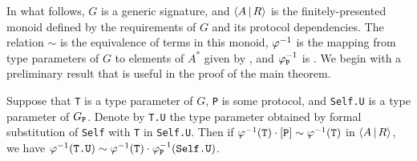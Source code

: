 \documentclass[../generics]{subfiles}
\begin{document}
In what follows, $G$ is a generic signature, and $\langle A\,|\,R\rangle$ is the finitely-presented monoid defined by the requirements of $G$ and its protocol dependencies. The relation $\sim$ is the equivalence of terms in this monoid, $\varphi^{-1}$ is the mapping from type parameters of $G$ to elements of $A^*$ given by , and $\varphi^{-1}_\texttt{P}$ is . We begin with a preliminary result that is useful in the proof of the main theorem.

\begin{lemma}\label{type param composition lemma}
Suppose that \texttt{T} is a type parameter of $G$, \texttt{P} is some protocol, and \texttt{Self.U} is a type parameter of $G_{\texttt{P}}$. Denote by \texttt{T.U} the type parameter obtained by formal substitution of \texttt{Self} with \texttt{T} in \texttt{Self.U}. Then if $\varphi^{-1}(\texttt{T})\cdot[\texttt{P}]\sim\varphi^{-1}(\texttt{T})$ in $\langle A\,|\,R\rangle$, we have $\varphi^{-1}(\texttt{T.U})\sim\varphi^{-1}(\texttt{T})\cdot\varphi^{-1}_\texttt{P}(\texttt{Self.U})$.
\end{lemma}
\end{document}
